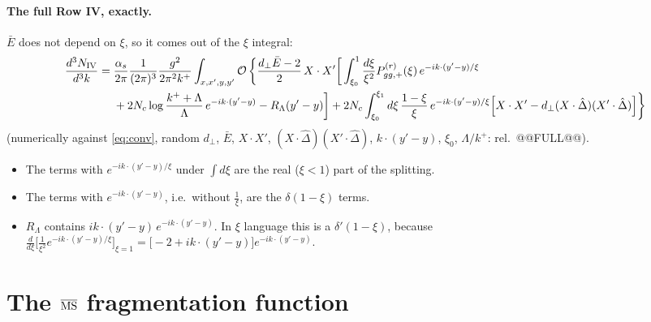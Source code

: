 \documentclass[10pt]{article}
\numberwithin{equation}{section}
\newcommand{\Dh}{\hat\Delta}
\newcommand{\OO}{\mathcal O}
\newcommand{\pre}{\frac{1}{(2\pi)^3}\frac{g^2}{2\pi^2k^+}}
\begin{document}
\paragraph{The full Row IV, exactly.} $\bar E$ does not depend on $\xi$, so it comes out of the $\xi$ integral:
\begin{align}
\frac{d^3N_{\rm IV}}{d^3k}={}&\frac{\alpha_s}{2\pi}\pre\int_{x,x',y,y'}\OO\,\bigg\{\frac{d_\perp\bar E-2}{2}\,X\cdot X'\bigg[\int_{\xi_0}^1\frac{d\xi}{\xi^2}P^{(r)}_{gg,+}(\xi)\,e^{-ik\cdot(y'-y)/\xi}\notag\\
&+2N_c\log\frac{k^++\Lambda}{\Lambda}\,e^{-ik\cdot(y'-y)}-R_\Lambda(y'-y)\bigg]+2N_c\int_{\xi_0}^{\xi_1}d\xi\,\frac{1-\xi}{\xi}\,e^{-ik\cdot(y'-y)/\xi}\Big[X\cdot X'-d_\perp(X\cdot\Dh)(X'\cdot\Dh)\Big]\bigg\}
\label{eq:full}
\end{align}
(numerically against \eqref{eq:conv}, random $d_\perp$, $\bar E$, $X\cdot X'$, $(X\cdot\Dh)(X'\cdot\Dh)$, $k\cdot(y'-y)$, $\xi_0$, $\Lambda/k^+$: rel.\ @@FULL@@).
\begin{itemize}
\item The terms with $e^{-ik\cdot(y'-y)/\xi}$ under $\int d\xi$ are the real ($\xi<1$) part of the splitting.
\item The terms with $e^{-ik\cdot(y'-y)}$, i.e.\ without $\frac1\xi$, are the $\delta(1-\xi)$ terms.
\item $R_\Lambda$ contains $ik\cdot(y'-y)\,e^{-ik\cdot(y'-y)}$. In $\xi$ language this is a $\delta'(1-\xi)$, because $\frac{d}{d\xi}\big[\frac{1}{\xi^2}e^{-ik\cdot(y'-y)/\xi}\big]_{\xi=1}=\big[-2+ik\cdot(y'-y)\big]e^{-ik\cdot(y'-y)}$.
\end{itemize}

\section{The \texorpdfstring{$\overline{\rm MS}$}{MS-bar} fragmentation function}\label{sec:FF}
\end{document}

